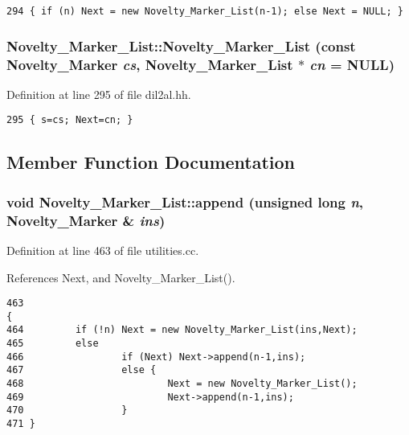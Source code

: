 \footnotesize\begin{verbatim}294 { if (n) Next = new Novelty_Marker_List(n-1); else Next = NULL; }
\end{verbatim}\normalsize 
{}
\subsubsection{\setlength{\rightskip}{0pt plus 5cm}Novelty\_\-Marker\_\-List::Novelty\_\-Marker\_\-List (const {\bf Novelty\_\-Marker} {\em cs}, Novelty\_\-Marker\_\-List $\ast$ {\em cn} = NULL)\hspace{0.3cm}{\tt  [inline]}}\label{classNovelty__Marker__List_a3}




Definition at line 295 of file dil2al.hh.



\footnotesize\begin{verbatim}295 { s=cs; Next=cn; }
\end{verbatim}\normalsize 


\subsection{Member Function Documentation}
\subsubsection{\setlength{\rightskip}{0pt plus 5cm}void Novelty\_\-Marker\_\-List::append (unsigned long {\em n}, {\bf Novelty\_\-Marker} \& {\em ins})}\label{classNovelty__Marker__List_a6}




Definition at line 463 of file utilities.cc.

References Next, and Novelty\_\-Marker\_\-List().



\footnotesize\begin{verbatim}463                                                                       {
464         if (!n) Next = new Novelty_Marker_List(ins,Next);
465         else
466                 if (Next) Next->append(n-1,ins);
467                 else {
468                         Next = new Novelty_Marker_List();
469                         Next->append(n-1,ins);
470                 }
471 }
\end{verbatim}\normalsize 
{}
